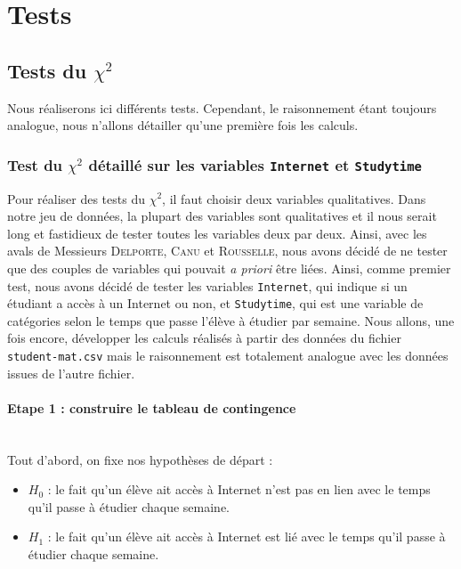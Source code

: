 \documentclass[11pt]{article}
\begin{document}
\newpage
\FloatBarrier
\section{Tests}
\subsection{Tests du $\chi ^2$}
Nous réaliserons ici différents tests. Cependant, le raisonnement étant toujours analogue, nous n'allons détailler qu'une première fois les calculs.
\subsubsection{Test du $\chi^2$ détaillé sur les variables \texttt{Internet} et \texttt{Studytime}}
Pour réaliser des tests du $\chi^2$, il faut choisir deux variables qualitatives. Dans notre jeu de données, la plupart des variables sont qualitatives et il nous serait long et fastidieux de tester toutes les variables deux par deux. Ainsi, avec les avals de Messieurs \textsc{Delporte}, \textsc{Canu} et \textsc{Rousselle}, nous avons décidé de ne tester que des couples de variables qui pouvait \emph{a priori} être liées. Ainsi, comme premier test, nous avons décidé de tester les variables \texttt{Internet}, qui indique si un étudiant a accès à un Internet ou non, et \texttt{Studytime}, qui est une variable de catégories selon le temps que passe l'élève à étudier par semaine. Nous allons, une fois encore, développer les calculs réalisés à partir des données du fichier \texttt{student-mat.csv} mais le raisonnement est totalement analogue avec les données issues de l'autre fichier.

\paragraph{Etape 1 : construire le tableau de contingence}~\\\indent
Tout d'abord, on fixe nos hypothèses de départ : 
\begin{itemize}
\item[\textbullet] \og $H_0$ : le fait qu'un élève ait accès à Internet n'est pas en lien avec le temps qu'il passe à étudier chaque semaine\fg.
\item[\textbullet] \og $H_1$ : le fait qu'un élève ait accès à Internet est lié avec le temps qu'il passe à étudier chaque semaine\fg.
\end{itemize}
\end{document}
